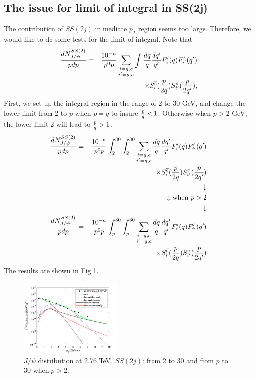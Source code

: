 \documentclass[twocolumn,aps,superscriptaddress,nofootinbib,floatfix]{revtex4}
\begin{document}
\subsection{The issue for limit of integral in SS(2j)}\label{integral issue}
The contribution of $SS(2j)$ in mediate $p_T$ region seems too large. Therefore, we would like to do some tests for the limit of integral. Note that
\begin{eqnarray}
	\frac{dN^{SS(2)}_{J/\psi}}{pdp}&=&\frac{10^{-n}}{p^0p}\sum_{\substack{i=g,c\\ i'=g,c}} \int \frac{dq}{q}\frac{dq'}{q'}F'_i(q)F'_{i'}(q')\nonumber \\
	&&\times  S_i^{\overline c}({p\over 2q})   S_{i'}^c({p\over 2q'}), \label{ss2_jpsi}
\end{eqnarray}
First, we set up the integral region in the range of 2 to 30 GeV, and change the lower limit from 2 to $p$ when $p=q$ to insure ${p\over q}<1$. Otherwise when $p>2$ GeV, the lower limit 2 will lead to ${p\over q}>1$.
\begin{eqnarray}
	\frac{dN^{SS(2)}_{J/\psi}}{pdp}&=&\frac{10^{-n}}{p^0p}
	\int^{30}_{2}\int^{30}_{2}
	\sum_{\substack{i=g,c\\ i'=g,c}}  \frac{dq}{q}\frac{dq'}{q'}F'_i(q)F'_{i'}(q')\nonumber \\
	&&\times  S_i^{\overline c}({p\over 2q})   S_{i'}^c({p\over 2q'})\\
	&&\downarrow   \nonumber \\
	&&\downarrow   \text{when $p>2$}	 \nonumber \\
	&&\downarrow   \nonumber \\
	\frac{dN^{SS(2)}_{J/\psi}}{pdp}&=&\frac{10^{-n}}{p^0p}
	\int^{30}_{p}\int^{30}_{p}
	\sum_{\substack{i=g,c\\ i'=g,c}}  \frac{dq}{q}\frac{dq'}{q'}F'_i(q)F'_{i'}(q')\nonumber \\
	&&\times  S_i^{\overline c}({p\over 2q})   S_{i'}^c({p\over 2q'}) 
\end{eqnarray}
The results are shown in Fig.\ref{fig19}.
\begin{figure}[H]
	\includegraphics[width=0.45\textwidth]{p_2_30.png}
	\caption{$J/\psi$ distribution at 2.76 TeV. $SS(2j)$: from 2 to 30 and from $p$ to 30 when $p>2$.}
	\label{fig19}
\end{figure}
\end{document}
